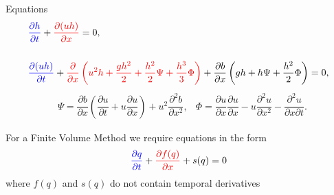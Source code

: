 \documentclass[]{beamer}
\begin{document}
\begin{frame}{Equations}
	\begin{subequations}
		\begin{align*}
		& {\color{blue}\frac{\partial h}{\partial t}} + {\color{red}\dfrac{\partial (uh)}{\partial x}} = 0,  \\ \\
		& {\color{blue}\dfrac{\partial (uh)}{\partial t}} +  {\color{red}\dfrac{\partial}{\partial x} \left ( u^2h + \dfrac{gh^2}{2} + \dfrac{h^2}{2}{\Psi } + \dfrac{h^3}{3}{ { \Phi } }  \right ) }  +  \dfrac{\partial b}{\partial x} \left (gh +   h {\Psi } + \dfrac{h^2}{2}{ {  \Phi } }  \right ) = 0,
		\end{align*}
	\end{subequations}
	\begin{align*}
	&{ \Psi }  = \dfrac{\partial b}{\partial x}\left(\dfrac{\partial u}{\partial t} + u\dfrac{\partial u}{\partial x} \right)  + u^2\dfrac{\partial^2 b}{\partial x^2}, &
	{  \Phi }  = \dfrac{\partial u }{\partial x} \dfrac{\partial u}{\partial x} -u \dfrac{\partial^2 u}{\partial x^2}  - \dfrac{\partial^2 u}{\partial x \partial t} .
	\end{align*}
	
	For a Finite Volume Method we require equations in the form
	\begin{equation*}
	{\color{blue}\frac{\partial q}{\partial t}} +  {\color{red}\frac{\partial f(q)}{\partial x}} + s(q) = 0
	\end{equation*}
	where $f(q)$ and $s(q)$ do not contain temporal derivatives
\end{frame}
\end{document}
